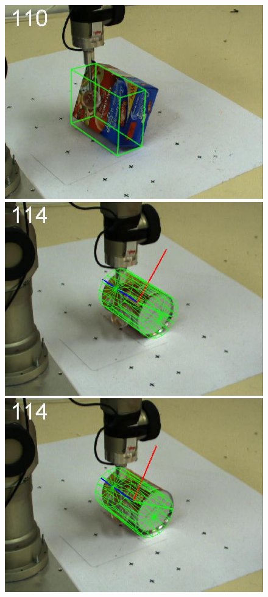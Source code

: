 \begin{figure}[htbp]
{\includegraphics[width=\imgAXwid]{./A2_LWPR1_399_2}
\includegraphics[width=\imgAXwid]{./A3_2exp_39_2}
\includegraphics[width=\imgAXwid]{./A3_LWPR1_39_2}
}
\end{figure}
